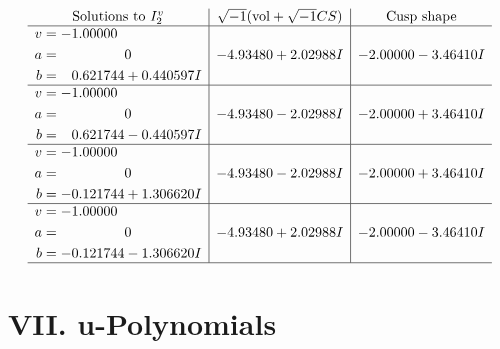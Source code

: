 \documentclass[1p]{elsarticle_modified}
\theoremstyle{definition}
\newcommand{\I}{\sqrt{-1}}
\begin{document}
$$\begin{array}{c|c|c}  
\text{Solutions to }I^v_{2}& \I (\text{vol} + \sqrt{-1}CS) & \text{Cusp shape}\\
 \hline 
\begin{aligned}
v &= -1.00000\phantom{ +0.000000I} \\
a &= \phantom{-0.000000 } 0 \\
b &= \phantom{-}0.621744 + 0.440597 I\end{aligned}
 & -4.93480 + 2.02988 I & -2.00000 - 3.46410 I \\ \hline\begin{aligned}
v &= -1.00000\phantom{ +0.000000I} \\
a &= \phantom{-0.000000 } 0 \\
b &= \phantom{-}0.621744 - 0.440597 I\end{aligned}
 & -4.93480 - 2.02988 I & -2.00000 + 3.46410 I \\ \hline\begin{aligned}
v &= -1.00000\phantom{ +0.000000I} \\
a &= \phantom{-0.000000 } 0 \\
b &= -0.121744 + 1.306620 I\end{aligned}
 & -4.93480 - 2.02988 I & -2.00000 + 3.46410 I \\ \hline\begin{aligned}
v &= -1.00000\phantom{ +0.000000I} \\
a &= \phantom{-0.000000 } 0 \\
b &= -0.121744 - 1.306620 I\end{aligned}
 & -4.93480 + 2.02988 I & -2.00000 - 3.46410 I\\
 \hline 
 \end{array}$$\newpage
\newpage\renewcommand{\arraystretch}{1}
\centering \section*{ VII. u-Polynomials}
\end{document}
